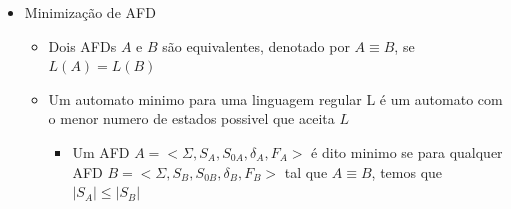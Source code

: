 \documentclass[12pt]{article}
\begin{document}
\begin{itemize}
\begin{itemize}
            \begin{itemize}
                \item Dado o AFND:
                \item [] imagem
                \item Cria um estado para cada combinação possivel de estados 
                do AFND
                \item Estabelece-se como estado inicial a combinação 
                correspondente ao conjunto de estados iniciais do AFND
                \item Estados finais: todos que possuem em sua combinação algum 
                dos estado finais do AFND
                \item Criação das transições:
                \begin{itemize}
                    \item $\delta^d(Q,a)$ será igual ao estado que corresponda 
                    à combinação de todos os estados que formam o conjunto 
                    $\delta(Q,a)$
                    \item[] imagem
                \end{itemize}
            \end{itemize}
            \item Durante a transformaçãp de um AFND em um AFD podem ser criados 
            estados que fiquem "isolados" do(s) estado(s) inicial(is)
            \item Exercicio: Transforme o AFND descrito a seguir em um AFD
            \item [] imagem
        \end{itemize}
        \item Minimização de AFD
        \begin{itemize}
            \item Dois AFDs $A$ e $B$ são equivalentes, denotado por $A 
            \equiv B$, se $L(A) = L(B)$
            \item Um automato minimo para uma linguagem regular L é um 
            automato com o menor numero de estados possivel que aceita $L$
            \begin{itemize}
                \item Um AFD $A = <\Sigma, S_A, S_{0A}, \delta_A, F_A>$ é 
                dito minimo se para qualquer AFD $B = <\Sigma, S_B, S_{0B}, 
                \delta_B, F_B>$ tal que $A \equiv B$, temos que $|S_A|\leq
                |S_B|$
            \end{itemize}

\end{itemize}
\end{itemize}
\end{document}
